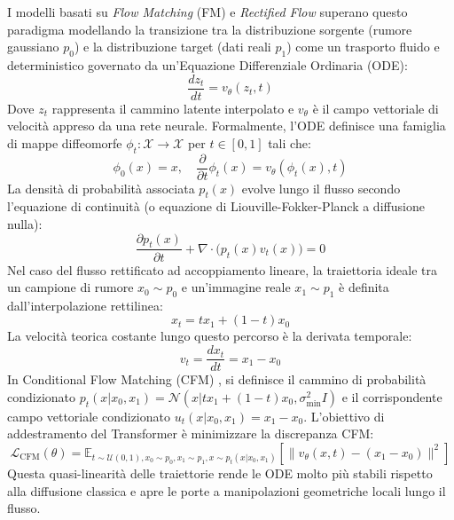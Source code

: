 \documentclass[12pt,a4paper]{report}
\begin{document}
I modelli basati su \textit{Flow Matching} (FM) e \textit{Rectified Flow} \cite{lipman2023flow, liu2022flow} superano questo paradigma modellando la transizione tra la distribuzione sorgente (rumore gaussiano $p_0$) e la distribuzione target (dati reali $p_1$) come un trasporto fluido e deterministico governato da un'Equazione Differenziale Ordinaria (ODE):
\begin{equation}
    \frac{dz_t}{dt} = v_\theta(z_t, t)
\end{equation}
Dove $z_t$ rappresenta il cammino latente interpolato e $v_\theta$ è il campo vettoriale di velocità appreso da una rete neurale. Formalmente, l'ODE definisce una famiglia di mappe diffeomorfe $\phi_t: \mathcal{X} \to \mathcal{X}$ per $t \in [0, 1]$ tali che:
\begin{equation}
    \phi_0(x) = x, \quad \frac{\partial}{\partial t}\phi_t(x) = v_\theta(\phi_t(x), t)
\end{equation}
La densità di probabilità associata $p_t(x)$ evolve lungo il flusso secondo l'equazione di continuità (o equazione di Liouville-Fokker-Planck a diffusione nulla):
\begin{equation}
    \frac{\partial p_t(x)}{\partial t} + \nabla \cdot \Big( p_t(x) v_t(x) \Big) = 0
\end{equation}
Nel caso del flusso rettificato ad accoppiamento lineare, la traiettoria ideale tra un campione di rumore $x_0 \sim p_0$ e un'immagine reale $x_1 \sim p_1$ è definita dall'interpolazione rettilinea:
\begin{equation}
    x_t = t x_1 + (1 - t) x_0
\end{equation}
La velocità teorica costante lungo questo percorso è la derivata temporale:
\begin{equation}
    v_t = \frac{dx_t}{dt} = x_1 - x_0
\end{equation}
In Conditional Flow Matching (CFM) \cite{lipman2023flow}, si definisce il cammino di probabilità condizionato $p_t(x|x_0, x_1) = \mathcal{N}(x | t x_1 + (1-t)x_0, \sigma_{\min}^2 I)$ e il corrispondente campo vettoriale condizionato $u_t(x|x_0, x_1) = x_1 - x_0$. L'obiettivo di addestramento del Transformer è minimizzare la discrepanza CFM:
\begin{equation}
    \mathcal{L}_{\text{CFM}}(\theta) = \mathbb{E}_{t \sim \mathcal{U}(0,1), x_0 \sim p_0, x_1 \sim p_1, x \sim p_t(x|x_0, x_1)} \left[ \| v_\theta(x, t) - (x_1 - x_0) \|^2 \right]
\end{equation}
Questa quasi-linearità delle traiettorie rende le ODE molto più stabili rispetto alla diffusione classica e apre le porte a manipolazioni geometriche locali lungo il flusso.
\end{document}
